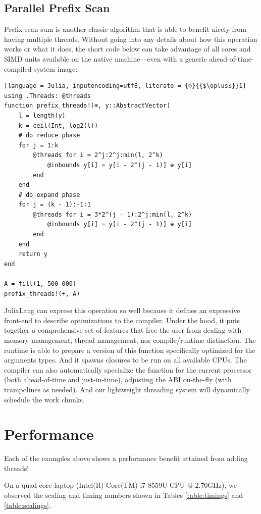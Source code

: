 \documentclass{juliacon}
\begin{document}
\subsection{Parallel Prefix Scan}
\label{subsub:ppscan}

Prefix-scan-sum is another classic algorithm that is able to benefit nicely from having multiple threads. Without going into any details about how this operation works or what it does, the short code below can take advantage of all cores and SIMD units available on the native machine—even with a generic ahead-of-time-compiled system image:

\begin{lstlisting}[language = Julia, inputencoding=utf8, literate = {⊕}{{$\oplus$}}1]
using .Threads: @threads
function prefix_threads!(⊕, y::AbstractVector)
    l = length(y)
    k = ceil(Int, log2(l))
    # do reduce phase
    for j = 1:k
        @threads for i = 2^j:2^j:min(l, 2^k)
            @inbounds y[i] = y[i - 2^(j - 1)] ⊕ y[i]
        end
    end
    # do expand phase
    for j = (k - 1):-1:1
        @threads for i = 3*2^(j - 1):2^j:min(l, 2^k)
            @inbounds y[i] = y[i - 2^(j - 1)] ⊕ y[i]
        end
    end
    return y
end

A = fill(1, 500_000)
prefix_threads!(+, A)
\end{lstlisting}

JuliaLang can express this operation so well because it defines an expressive front-end to describe optimizations to the compiler. Under the hood, it puts together a comprehensive set of features that free the user from dealing with memory management, thread management, nor compile/runtime distinction. The runtime is able to prepare a version of this function specifically optimized for the arguments types. And it spawns closures to be run on all available CPUs. The compiler can also automatically specialize the function for the current processor (both ahead-of-time and just-in-time), adjusting the ABI on-the-fly (with trampolines as needed). And our lightweight threading system will dynamically schedule the work chunks.

\section{Performance}
\label{subsub:performance}

Each of the examples above shows a performance benefit attained from adding threads!

On a quad-core laptop (Intel(R) Core(TM) i7-8559U CPU @ 2.70GHz), we observed the scaling and timing numbers shown in Tables \ref{table:timings} and \ref{table:scalings}.
\end{document}
